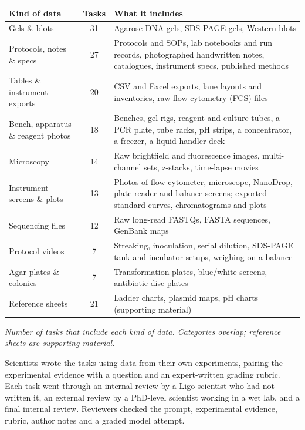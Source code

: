 \documentclass{article}
\newcommand{\figcap}[1]{\vspace{4pt}\par{\noindent\itshape\small #1\par}}
\begin{document}
\begin{table}[H]
  \centering
  \renewcommand{\arraystretch}{1.25}
  \begin{tabularx}{\textwidth}{>{\raggedright\arraybackslash}p{} c >{\raggedright\arraybackslash}X}
    \toprule
    \textbf{Kind of data} & \textbf{Tasks} & \textbf{What it includes} \\
    \midrule
    Gels \& blots & 31 & Agarose DNA gels, SDS-PAGE gels, Western blots \\
    Protocols, notes \& specs & 27 & Protocols and SOPs, lab notebooks and run records, photographed handwritten notes, catalogues, instrument specs, published methods \\
    Tables \& instrument exports & 20 & CSV and Excel exports, lane layouts and inventories, raw flow cytometry (FCS) files \\
    Bench, apparatus \& reagent photos & 18 & Benches, gel rigs, reagent and culture tubes, a PCR plate, tube racks, pH strips, a concentrator, a freezer, a liquid-handler deck \\
    Microscopy & 14 & Raw brightfield and fluorescence images, multi-channel sets, z-stacks, time-lapse movies \\
    Instrument screens \& plots & 13 & Photos of flow cytometer, microscope, NanoDrop, plate reader and balance screens; exported standard curves, chromatograms and plots \\
    Sequencing files & 12 & Raw long-read FASTQs, FASTA sequences, GenBank maps \\
    Protocol videos & 7 & Streaking, inoculation, serial dilution, SDS-PAGE tank and incubator setups, weighing on a balance \\
    Agar plates \& colonies & 7 & Transformation plates, blue/white screens, antibiotic-disc plates \\
    Reference sheets & 21 & Ladder charts, plasmid maps, pH charts (supporting material) \\
    \bottomrule
  \end{tabularx}
  \figcap{Number of tasks that include each kind of data. Categories overlap; reference sheets are supporting material.}
\end{table}

Scientists wrote the tasks using data from their own experiments, pairing the experimental evidence with a question and an expert-written grading rubric. Each task went through an internal review by a Ligo scientist who had not written it, an external review by a PhD-level scientist working in a wet lab, and a final internal review. Reviewers checked the prompt, experimental evidence, rubric, author notes and a graded model attempt.
\end{document}
